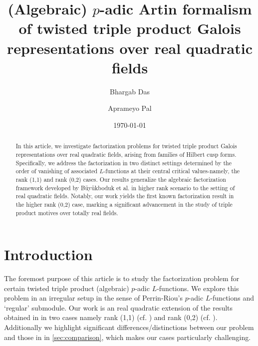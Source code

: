 \documentclass[10pt]{amsart}
\numberwithin{equation}{section}
\theoremstyle{definition}
\theoremstyle{remark} %
\begin{document}
 
	
	\title[$ p $-adic Artin formalism of twisted triple product Galois representations]{(Algebraic) $ p $-adic Artin formalism of twisted triple product Galois representations over real quadratic fields} 
	
	\author{Bhargab Das} 
	\address{(Bhargab Das) Harish-Chandra Research Institute, A CI of Homi Bhabha National Institute, Chhatnag Road, Jhunsi, Prayagraj - 211019, India}
	
	\author{Aprameyo Pal} 
	\address{(Aprameyo Pal) Harish-Chandra Research Institute, A CI of Homi Bhabha National Institute, Chhatnag Road, Jhunsi, Prayagraj - 211019, India}
	
	
	\date{\today }
	
	\begin{abstract}
		In this article, we investigate factorization problems for twisted triple product Galois representations over real quadratic fields, arising from families of Hilbert cusp forms. Specifically, we address the factorization in two distinct settings determined by the order of vanishing of associated $L$-functions at their central critical values-namely, the rank (1,1) and rank (0,2) cases. Our results generalize the algebraic factorization framework developed by Büyükboduk et al. in higher rank scenario to the setting of real quadratic fields.
		Notably, our work yields the first known factorization result in the higher rank (0,2) case, marking a significant advancement in the study of triple product motives over totally real fields.
		
		
	\end{abstract}
	
	\maketitle
	
	
	
	
	
	\tableofcontents
	
	
	\section{Introduction}
	\label{section:intro}
	The foremost purpose of this article is to study the factorization problem for certain twisted triple product (algebraic) $ p $-adic $ L $-functions. We explore this problem in an irregular setup in the sense of Perrin-Riou's $ p $-adic $ L $-functions and \enquote*{regular} submodule. Our work is an real quadratic extension of the results obtained in \cite{BCS23} in two cases namely rank (1,1) (cf. \cite[.2]{Darmon16GenralisedKatoClasses}) and rank (0,2) (cf. \cite[.3]{Darmon16GenralisedKatoClasses}). Additionally we highlight significant differences/distinctions between our problem and those in \cite{Greenberg1982,Palva18} in \textsection \ref{sec:comparison}, which makes our cases particularly challenging. 
	
\end{document}
